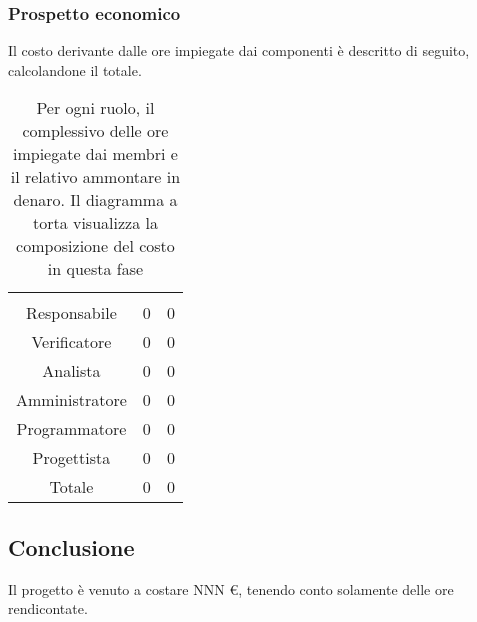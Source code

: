 \subsubsection{Prospetto economico}
Il costo derivante dalle ore impiegate dai componenti è descritto di seguito, calcolandone il totale.

\begin{table}[H]
{\setlength{\parindent}{0cm}
\begin{minipage}{.43\textwidth}
	\begin{tabular}{ccc}
	\rowcolorhead
	\headertitle{Ruolo} & \headertitle{Ore} & \headertitle{Costo(€)}\\
	Responsabile & 0 & 0\\
	Verificatore & 0 & 0\\
	Analista & 0 & 0\\
	Amministratore & 0 & 0\\
	Programmatore & 0 & 0\\
	Progettista & 0 & 0\\
	\hline
	Totale & 0& 0\\
	\end{tabular}
\end{minipage}%
\begin{minipage}{.57\textwidth}
\end{minipage} }
\caption{Per ogni ruolo, il complessivo delle ore impiegate dai membri e il relativo ammontare in denaro. Il diagramma a torta visualizza la composizione del costo in questa fase}
\end{table}


\subsection{Conclusione}
Il progetto è venuto a costare NNN €, tenendo conto solamente delle ore rendicontate.
